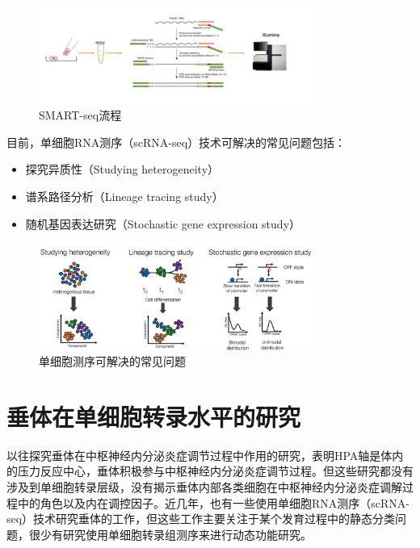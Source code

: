 \begin{figure}[!htb]
  \centering
  \includegraphics[width=0.8\textwidth]{figs/scseq-smart.png}
  \caption{SMART-seq流程}
  \label{fig:scseq-smart}
\end{figure}

  目前，单细胞RNA测序（scRNA-seq）技术可解决的常见问题\cite{liu2016single,junker2014every}包括：
\begin{itemize}
    \item 探究异质性（Studying heterogeneity）
    \item 谱系路径分析（Lineage tracing study）
    \item 随机基因表达研究（Stochastic gene expression study）
\end{itemize}

\begin{figure}[!htb]
  \centering
  \includegraphics[width=0.8\textwidth]{figs/scseq-purpose.png}
  \caption{单细胞测序可解决的常见问题}
  \label{fig:scseq-purpose}
\end{figure}

\section{垂体在单细胞转录水平的研究}
  以往探究垂体在中枢神经内分泌炎症调节过程中作用的研究\cite{chrousos1995hypothalamic,shanks2000early}，表明HPA轴是体内的压力反应中心，垂体积极参与中枢神经内分泌炎症调节过程。但这些研究都没有涉及到单细胞转录层级，没有揭示垂体内部各类细胞在中枢神经内分泌炎症调解过程中的角色以及内在调控因子。近几年，也有一些使用单细胞RNA测序（scRNA-seq）技术研究垂体的工作\cite{chen2020single,cheung2018single,ho2020single,fletcher2019cell}，但这些工作主要关注于某个发育过程中的静态分类问题，很少有研究使用单细胞转录组测序来进行动态功能研究。

